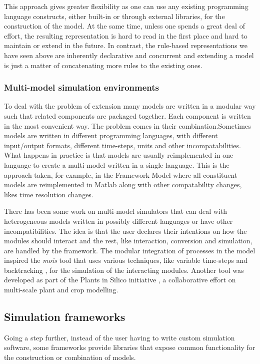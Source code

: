 This approach gives greater flexibility as one can use any existing programming
language constructs, either built-in or through external libraries, for the
construction of the model. At the same time, unless one spends a great deal of
effort, the resulting representation is hard to read in the first place and hard
to maintain or extend in the future. In contrast, the rule-based representations
we have seen above are inherently declarative and concurrent and extending a
model is just a matter of concatenating more rules to the existing ones.

\subsubsection{Multi-model simulation environments}
To deal with the problem of extension many models are written in a modular way
such that related components are packaged together. Each component is written in
the most convenient way. The problem comes in their combination.Sometimes models
are written in different programming languages, with different input/output
formats, different time-steps, units and other incompatabilities. What happens
in practice is that models are usually reimplemented in one language to create a
multi-model written in a single language. This is the approach taken, for
example, in the Framework Model where all constituent models are reimplemented
in Matlab along with other compatability changes, likes time resolution changes.

There has been some work on multi-model simulators that can deal with
heterogeneous models written in possibly different languages or have other
incompatibilities. The idea is that the user declares their intentions on how
the modules should interact and the rest, like interaction, conversion and
simulation, are handled by the framework. The modular integration of processes
in the \citet{karr_whole-cell_2012} model inspired the \emph{mois} tool
\citep{erbm_mois_2015} that uses various techniques, like variable time-steps
and backtracking \citep{bucher2013decomposition}, for the simulation of the
interacting modules. Another tool \citep{cis_2018} was developed as part of the
Plants in Silico initiative \citep{zhu_plants_2016}, a collaborative effort on
multi-scale plant and crop modelling.

\subsection{Simulation frameworks}
Going a step further, instead of the user having to write custom simulation
software, some frameworks provide libraries that expose common functionality for
the construction or combination of models.

